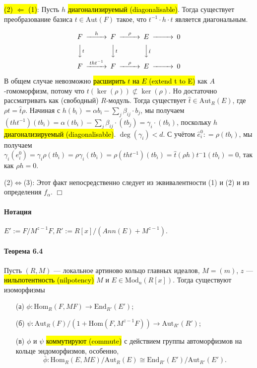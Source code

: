 \documentclass[a4paper,12pt]{article}
\newcommand{\hatei}[1]{\hat{e}_{#1}}
\newcommand{\Endom}{\text{End}}
\newcommand{\Hom}{\text{Hom}}
\newcommand{\Aut}{\text{Aut}}
\newcommand{\Mod}{\text{Mod}}
\begin{document}
\hl{(2) $\Leftarrow$ (1)}: Пусть $h$ \hl{диагонализируемый (diagonalisable)}. Тогда существует преобразование базиса $t \in \Aut(F)$ такое, что $t^{-1} \cdot h \cdot t$ является диагональным.

$$
\begin{CD}
	 F 	@>h>> 			F 		@>\rho>>	E	@>>> 0\\
	 @VVtV 				@VVtV			@VV\hat{t}V	\\
	 F 	@>tht^{-1}>>	F		@>\rho>>	E	@>>> 0
\end{CD}
$$

В общем случае невозможно \hl{расширить $t$ на $E$ (extend t to E)} как $A$-гомоморфизм, потому что $t(\ker(\rho)) \not \subset \ker(\rho)$. Но достаточно рассматривать как (свободный) $R$-модуль. Тогда существует $\hat{t} \in \Aut_R (E)$, где $\rho t = \hat{t} \rho$. Начиная с $h(b_i) = \alpha b_i - \sum_j \beta_{ij} \cdot b_j$, мы получаем $(tht^{-1})(tb_i) = \alpha (tb_i) - \sum_j \beta_{ij} \cdot (tb_j) = \gamma_i \cdot (tb_i)$, поскольку $h$ \hl{диагонализируемый (diagonalisable)}. $\deg(\gamma_i) < d$. С учётом $\hatei{i}^0 : = \rho (t b_i)$, мы получаем $\gamma_i (e_i^0) = \gamma_i \rho (t b_i) = \rho \gamma_i (t b_i) = \rho (tht^{-1}) (t b_i) = \hat{t} (\rho h) t^-1 (t b_i) = 0$, так как $\rho h = 0$.

(2)$\Leftrightarrow$(3): Этот факт непосредственно следует из эквивалентности (1) и (2) и из определения $f_\alpha$. $\Box$

\paragraph{Нотация}
$E' := F/M^{z-1}F, R' := R[x]/ (Ann(E) + M^{z-1})$.

\paragraph{Теорема 6.4}
Пусть $(R, M)$ --- локальное артиново кольцо главных идеалов, $M = (m)$, $z$ --- \hl{нильпотентность (nilpotency)} $M$ и $E \in \Mod_n (R[x])$. Тогда существуют изоморфизмы
\begin{itemize}
	\item[(а)] $\phi: \Hom_R(F, MF) \rightarrow \Endom_{R'}(E')$;
	\item[(б)] $\psi: \Aut_R (F)/(1+\Hom(F, M^{z-1}F)) \rightarrow \Aut_{R'}(R')$;
	\item[(в)] $\phi$ и $\psi$ \hl{коммутируют (commute)} с действием группы автоморфизмов на кольце эндоморфизмов, особенно, $$\bar{\phi} : \Hom_R(E, ME)/ \Aut_R(E) \cong \Endom_{R'}(E') / \Aut_{R'}(E').$$
\end{itemize}
 
\end{document}
